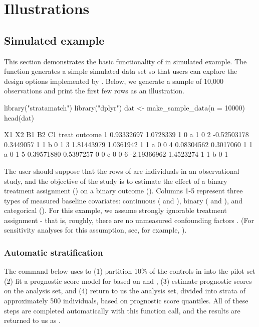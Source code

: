 \section{Illustrations} \label{sec:illustrations}

\subsection{Simulated example} \label{subsec:simulated_eg}

This section demonstrates the basic functionality of  in simulated example.  The function  generates a simple simulated data set so that users can explore the design options implemented by . Below, we generate a sample of 10,000 observations and print the first few rows as an illustration.

\begin{example}
library("stratamatch")
library("dplyr")
dat <- make_sample_data(n = 10000)
head(dat)
\end{example}
\begin{example}
           X1        X2 B1 B2 C1 treat outcome
1  0.93332697 1.0728339  1  0  a     1       0
2 -0.52503178 0.3449057  1  1  b     0       1
3  1.81443979 1.0361942  1  1  a     0       0
4  0.08304562 0.3017060  1  1  a     0       1
5  0.39571880 0.5397257  0  0  c     0       0
6 -2.19366962 1.4523274  1  1  b     0       1  
\end{example}

The user should suppose that the rows of  are individuals in an observational study, and the objective of the study is to estimate the effect of a binary treatment assignment () on a binary outcome ().    Columns 1-5 represent three types of measured baseline covariates: continuous ( and ), binary ( and ), and categorical (). For this example, we assume strongly ignorable treatment assignment - that is, roughly, there are no unmeasured confounding factors \citep{rosenbaum1983central}. (For sensitivity analyses for this assumption, see, for example, \citet{rosenbaum2005sensitivity}).

\subsubsection{Automatic stratification}\label{subsubsec:simulated_astrat}

The command below uses  to (1) partition 10\% of the controls in  into the pilot set (2) fit a prognostic score model for  based on  and , (3) estimate prognostic scores on the analysis set, and (4) return to us the analysis set, divided into strata of approximately 500 individuals, based on prognostic score quantiles. All of these steps are completed automatically with this function call, and the results are returned to us as .

